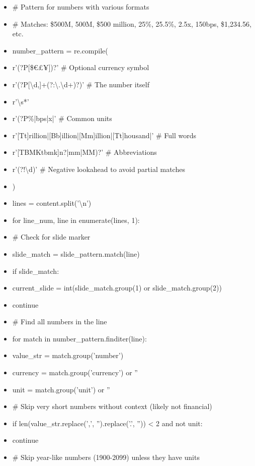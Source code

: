 \documentclass[11pt]{article}
\begin{document}
\begin{itemize}[leftmargin=*,itemsep=2pt,topsep=2pt]
\item {} \# Pattern for numbers with various formats
\item {} \# Matches: \$500M, 500M, \$500 million, 25\%, 25.5\%, 2.5x, 150bps, \$1,234.56, etc.
\item {} number\_\allowbreak{}pattern = re.compile(
\item {} r'(?P[\$€£¥])?' \# Optional currency symbol
\item {} r'(?P[\textbackslash{}d,]+(?:\textbackslash{}.\textbackslash{}d+)?)' \# The number itself
\item {} r'\textbackslash{}s*'
\item {} r'(?P\%|bps|x|' \# Common units
\item {} r'[Tt]rillion|[Bb]illion|[Mm]illion|[Tt]housand|' \# Full words
\item {} r'[TBMKtbmk]n?|mm|MM)?' \# Abbreviations
\item {} r'(?!\textbackslash{}d)' \# Negative lookahead to avoid partial matches
\item {} )
\item {} lines = content.split('\textbackslash{}n')
\item {} for line\_\allowbreak{}num, line in enumerate(lines, 1):
\item {} \# Check for slide marker
\item {} slide\_\allowbreak{}match = slide\_\allowbreak{}pattern.match(line)
\item {} if slide\_\allowbreak{}match:
\item {} current\_\allowbreak{}slide = int(slide\_\allowbreak{}match.group(1) or slide\_\allowbreak{}match.group(2))
\item {} continue
\item {} \# Find all numbers in the line
\item {} for match in number\_\allowbreak{}pattern.finditer(line):
\item {} value\_\allowbreak{}str = match.group('number')
\item {} currency = match.group('currency') or ''
\item {} unit = match.group('unit') or ''
\item {} \# Skip very short numbers without context (likely not financial)
\item {} if len(value\_\allowbreak{}str.replace(',', '').replace('.', '')) < 2 and not unit:
\item {} continue
\item {} \# Skip year-like numbers (1900-2099) unless they have units

\end{itemize}
\end{document}
